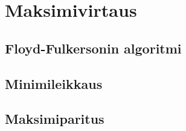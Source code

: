 \chapter{Maksimivirtaus}

\section{Floyd-Fulkersonin algoritmi}

\section{Minimileikkaus}

\section{Maksimiparitus}
